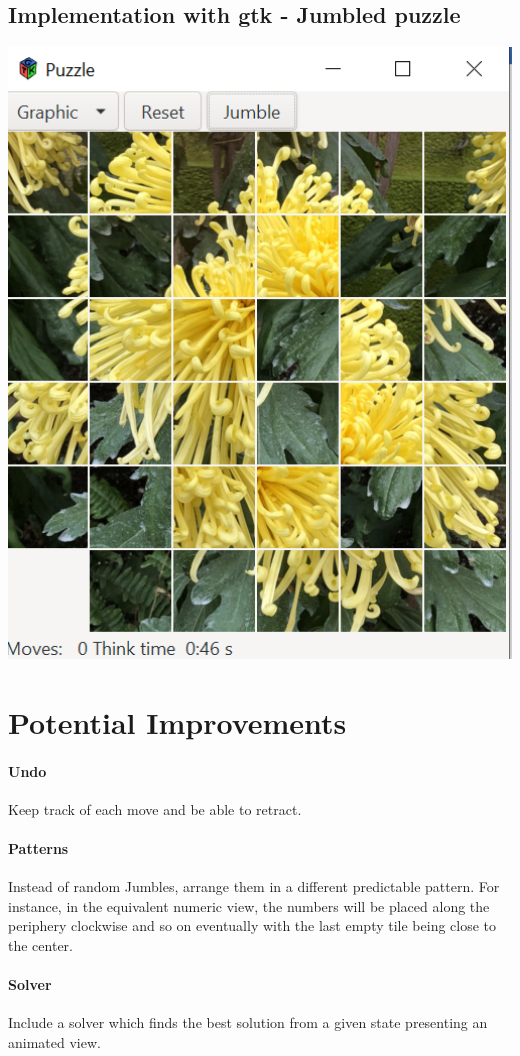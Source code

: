 \documentclass[a4paper,12pt]{article}
\theoremstyle{mytheor}
\begin{document}
\subsection*{Implementation with gtk - Jumbled puzzle}
\includegraphics[width=6in]{gtk_6_jumbled.png}

\section*{Potential Improvements}

\paragraph{Undo} Keep track of each move and be able to retract.
\paragraph{Patterns} Instead of random Jumbles, arrange them in a different predictable pattern. For instance, in the equivalent numeric view, the numbers will be placed along the periphery clockwise and so on eventually with the last empty tile being close to the center.
\paragraph{Solver} Include a solver which finds the best solution from a given state presenting an animated view.
\end{document}
